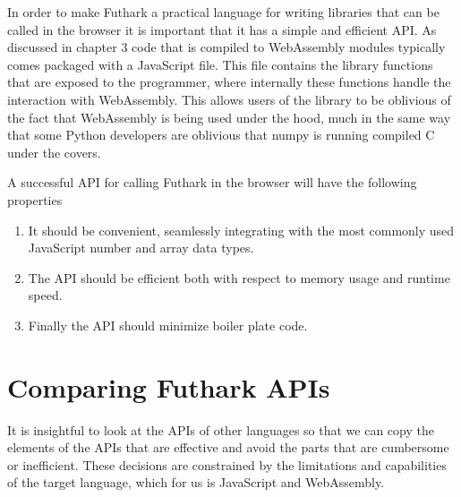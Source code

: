 \documentclass[11pt]{book}
\begin{document}



In order to make Futhark a practical language for writing libraries that can be called in the browser it is important that it has a simple and efficient API. As discussed in chapter 3 code that is compiled to WebAssembly modules typically comes packaged with a JavaScript file. This file contains the library functions that are exposed to the programmer, where internally these functions handle the interaction with WebAssembly. This allows users of the library to be oblivious of the fact that WebAssembly is being used under the hood, much in the same way that some Python developers are oblivious that numpy is running compiled C under the covers.

A successful API for calling Futhark in the browser will have the following properties
\begin{enumerate}
    \item It should be convenient, seamlessly integrating with the most commonly used JavaScript number and array data types.
    \item The API should be efficient both with respect to memory usage and runtime speed.
    \item Finally the API should minimize boiler plate code.
\end{enumerate}

\section{Comparing Futhark APIs}

It is insightful to look at the APIs of other languages so that we can copy the elements of the APIs that are effective and avoid the parts that are cumbersome or inefficient. These decisions are constrained by the limitations and capabilities of the target language, which for us is JavaScript and WebAssembly.
\end{document}
